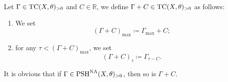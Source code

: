\begin{definition}\label{def:testcurvplusC}
    Let $\Gamma\in \mathrm{TC}(X,\theta)_{>0}$ and $C\in \mathbb{R}$, we define $\Gamma+C\in \mathrm{TC}(X,\theta)_{>0}$ as follows:
    \begin{enumerate}
        \item\label{itm:def:testcurvplusC:1} We set
        \[
            (\Gamma+C)_{\max}\coloneqq \Gamma_{\max}+C;
        \]
        \item\label{itm:def:testcurvplusC:2} for any $\tau<(\Gamma+C)_{\max}$, we set
        \[
        (\Gamma+C)_{\tau}\coloneqq \Gamma_{\tau-C}.
        \]
    \end{enumerate}
\end{definition}
It is obvious that if $\Gamma\in \mathrm{PSH}^{\mathrm{NA}}(X,\theta)_{>0}$, then so is $\Gamma+C$.

